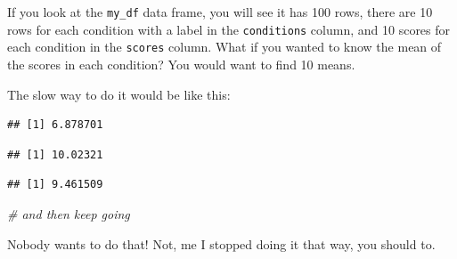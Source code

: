 \documentclass[
]{book}
\newenvironment{Shaded}{\begin{snugshade}}{\end{snugshade}}
\newcommand{\CommentTok}[1]{\textcolor[rgb]{0.56,0.35,0.01}{\textit{#1}}}
\newcommand{\FunctionTok}[1]{\textcolor[rgb]{0.00,0.00,0.00}{#1}}
\newcommand{\NormalTok}[1]{#1}
\newcommand{\SpecialCharTok}[1]{\textcolor[rgb]{0.00,0.00,0.00}{#1}}
\newcommand{\StringTok}[1]{\textcolor[rgb]{0.31,0.60,0.02}{#1}}
\begin{document}
If you look at the \texttt{my\_df} data frame, you will see it has 100 rows, there are 10 rows for each condition with a label in the \texttt{conditions} column, and 10 scores for each condition in the \texttt{scores} column. What if you wanted to know the mean of the scores in each condition? You would want to find 10 means.

The slow way to do it would be like this:

\begin{Shaded}
\end{Shaded}

\begin{verbatim}
## [1] 6.878701
\end{verbatim}

\begin{Shaded}
\end{Shaded}

\begin{verbatim}
## [1] 10.02321
\end{verbatim}

\begin{Shaded}
\end{Shaded}

\begin{verbatim}
## [1] 9.461509
\end{verbatim}

\begin{Shaded}
\begin{Highlighting}[]
\CommentTok{\# and then keep going}
\end{Highlighting}
\end{Shaded}

Nobody wants to do that! Not, me I stopped doing it that way, you should to.
\end{document}
